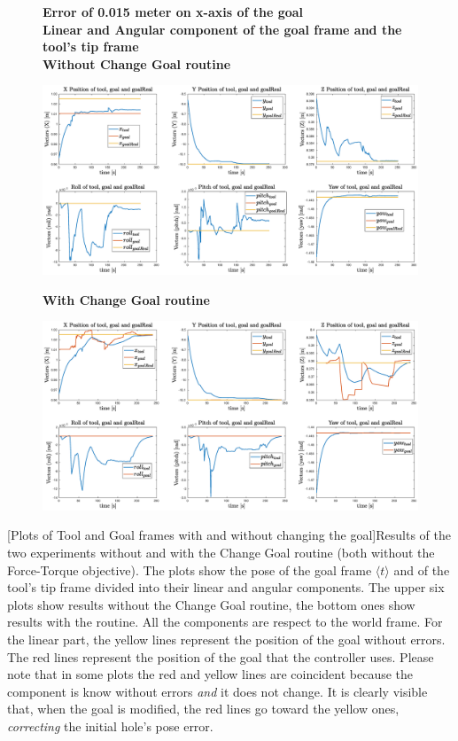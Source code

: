 \begin{figure} [H]
	\centering
	\textbf{Error of 0.015 meter on x-axis of the goal}\\
	\textbf{Linear and Angular component of the goal frame and the tool's tip frame}\\
\vspace{20px}
\textbf{Without Change Goal routine\\}
	\centerline{
		\includegraphics[width=22cm]{error_nothing/6_error.eps}
	}
	\vspace{15px}
\textbf{With Change Goal routine}
	\centerline{
		\includegraphics[width=22cm]{error_goal/6_error.eps}
	}
\end{figure}
\begingroup 
{}[Plots of Tool and Goal frames with and without changing the goal]{Results of the two experiments without and with the Change Goal routine (both without the Force-Torque objective). The plots show the pose of the goal frame $ \langle t \rangle$ and of the tool's tip frame divided into their linear and angular components. The upper six plots show results without the Change Goal routine, the bottom ones show results with the routine. All the components are respect to the world frame. For the linear part, the yellow lines represent the position of the goal without errors. The red lines represent the position of the goal that the controller uses. Please note that in some plots the red and yellow lines are coincident because the component is know without errors \emph{and} it does not change. It is clearly visible that, when the goal is modified, the red lines go toward the yellow ones, \textit{correcting} the initial hole's pose error.}
\label{fig:Error_nothingandgoal_plot6}
\endgroup



